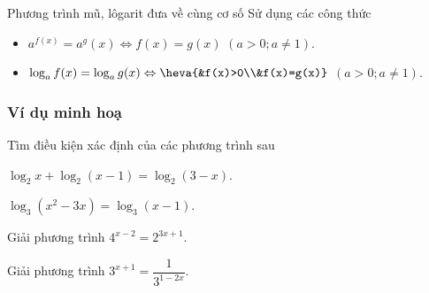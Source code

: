 \begin{dang}{Phương trình mũ, lôgarit đưa về cùng cơ số}
	Sử dụng các công thức
	\begin{itemize}
		\item $a^{f(x)}=a^g(x) \Leftrightarrow f(x)=g(x)$ $(a>0; a\neq 1)$.
		\item $\log_a f(x)=\log_a g(x)\Leftrightarrow \heva{&f(x)>0\\&f(x)=g(x)}$ $(a>0;a\neq 1)$.
	\end{itemize}
\end{dang}
\subsubsection{Ví dụ minh hoạ}
\begin{vd}%
	Tìm điều kiện xác định của các phương trình sau
	\begin{listEX}[2]
		\item $\log_2x+\log_2(x-1)=\log_2(3-x)$.
		\item $\log_3(x^2-3x)=\log_3(x-1)$.
	\end{listEX}
\end{vd}

\begin{vd} %
	Giải phương trình $4^{x-2}=2^{3x+1}$.
\end{vd}

\begin{vd} %
	Giải phương trình $3^{x+1}=\dfrac{1}{3^{1-2x}}$.
\end{vd}


